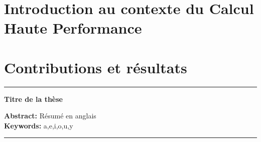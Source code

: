 \documentclass[11pt,twoside, french]{StyleThese}
\begin{document}
\printglossary[type=main]           %
\printglossary[type=\acronymtype]   %




\mainmatter

\part{Introduction au contexte du Calcul Haute Performance}



\part{Contributions et résultats}


\appendix






  \printindex


\cleardoublepage

\begin{vcenterpage}
\noindent\rule[2pt]{\textwidth}{0.5pt}
\begin{center}
{\large\textbf{Titre de la thèse\\}}
\end{center}
{\large\textbf{Abstract:}}
Résumé en anglais
\\
{\large\textbf{Keywords:}}
a,e,i,o,u,y
\\
\noindent\rule[2pt]{\textwidth}{0.5pt}
\end{vcenterpage}
\end{document}
